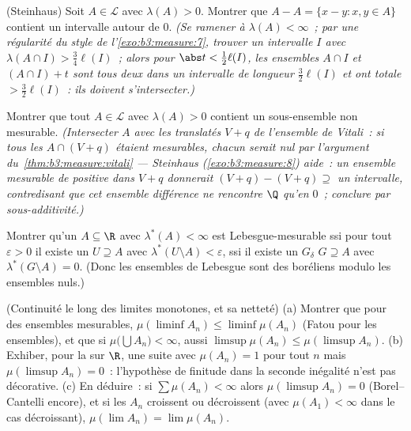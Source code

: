\begin{exercise}[$\star\star\star$]\label{exo:b3:measure:8}
(Steinhaus) Soit $A \in \mathcal L$ avec $\lambda(A) > 0$.
Montrer que $A - A = \{x - y : x, y \in A\}$ contient un
intervalle autour de $0$.
\emph{(Se ramener à $\lambda(A) < \infty$~; par une
régularité du style de l'\cref{exo:b3:measure:7}, trouver un
intervalle $I$ avec $\lambda(A \cap I) > \frac34\ell(I)$~;
alors pour $\abs t < \frac12\ell(I)$, les ensembles $A\cap I$
et $(A\cap I) + t$ sont tous deux dans un intervalle de
longueur $\frac32\ell(I)$ et ont  totale $>
\frac32\ell(I)$~: ils doivent s'intersecter.)}
\end{exercise}

\begin{exercise}[$\star\star\star$]\label{exo:b3:measure:9}
Montrer que tout $A \in \mathcal L$ avec $\lambda(A) > 0$
contient un sous-ensemble non mesurable. \emph{(Intersecter
$A$ avec les translatés $V + q$ de l'ensemble de Vitali~: si
tous les $A \cap (V+q)$ étaient mesurables, chacun serait
nul par l'argument du~\cref{thm:b3:measure:vitali} ---
Steinhaus (\cref{exo:b3:measure:8}) aide~: un ensemble
mesurable de  positive dans $V + q$ donnerait $(V+q) -
(V+q) \supseteq$ un intervalle, contredisant que cet ensemble
différence ne rencontre $\Q$ qu'en $0$~; conclure par
sous-additivité.)}
\end{exercise}

\begin{exercise}[$\star\star$]\label{exo:b3:measure:10}
Montrer qu'un $A \subseteq \R$ avec $\lambda^*(A) < \infty$
est Lebesgue-mesurable ssi pour tout $\varepsilon > 0$ il
existe un  $U \supseteq A$ avec $\lambda^*(U \setminus
A) < \varepsilon$, ssi il existe un $G_\delta$ $G \supseteq
A$ avec $\lambda^*(G\setminus A) = 0$. (Donc les ensembles
de Lebesgue sont des boréliens modulo les ensembles nuls.)
\end{exercise}

\begin{exercise}[$\star\star$]\label{exo:b3:measure:11}
(Continuité le long des limites monotones, et sa netteté)
(a) Montrer que pour des ensembles mesurables,
$\mu(\liminf A_n) \leq \liminf\mu(A_n)$ (Fatou pour les
ensembles), et que si $\mu\bigl(\bigcup A_n\bigr) < \infty$,
aussi $\limsup\mu(A_n) \leq \mu(\limsup A_n)$.
(b) Exhiber, pour la  sur $\R$, une suite
avec $\mu(A_n) = 1$ pour tout $n$ mais $\mu(\limsup A_n) =
0$~: l'hypothèse de finitude dans la seconde inégalité n'est
pas décorative.
(c) En déduire~: si $\sum\mu(A_n) < \infty$ alors
$\mu(\limsup A_n) = 0$ (Borel--Cantelli encore), et si les
$A_n$ croissent ou décroissent (avec $\mu(A_1) < \infty$
dans le cas décroissant), $\mu(\lim A_n) = \lim\mu(A_n)$.
\end{exercise}

